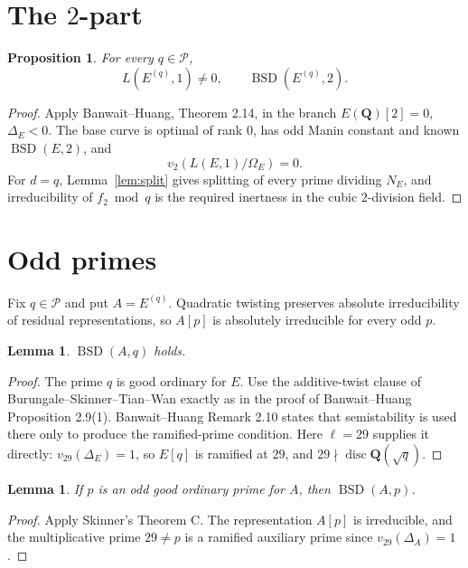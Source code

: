 \documentclass[11pt]{article}
\newtheorem{proposition}[theorem]{Proposition}
\newtheorem{lemma}[theorem]{Lemma}
\newcommand{\Q}{\mathbf Q}
\newcommand{\BSD}{\operatorname{BSD}}
\begin{document}
\section{The \(2\)-part}

\begin{proposition}\label{prop:2part}
For every \(q\in\mathcal P\),
\[
L(E^{(q)},1)\ne0,\qquad \BSD(E^{(q)},2).
\]
\end{proposition}

\begin{proof}
Apply Banwait--Huang, Theorem 2.14, in the branch
\(E(\Q)[2]=0\), \(\Delta_E<0\).  The base curve is optimal of rank \(0\),
has odd Manin constant and known \(\BSD(E,2)\), and
\[
v_2(L(E,1)/\Omega_E)=0.
\]
For \(d=q\), Lemma~\ref{lem:split} gives splitting of every prime dividing
\(N_E\), and irreducibility of \(f_2\bmod q\) is the required inertness in
the cubic \(2\)-division field.
\end{proof}

\section{Odd primes}

Fix \(q\in\mathcal P\) and put \(A=E^{(q)}\).
Quadratic twisting preserves absolute irreducibility of residual
representations, so \(A[p]\) is absolutely irreducible for every odd \(p\).

\begin{lemma}\label{lem:qpart}
\(\BSD(A,q)\) holds.
\end{lemma}

\begin{proof}
The prime \(q\) is good ordinary for \(E\).  Use the additive-twist clause
of Burungale--Skinner--Tian--Wan exactly as in the proof of
Banwait--Huang Proposition 2.9(1).  Banwait--Huang Remark 2.10 states that
semistability is used there only to produce the ramified-prime condition.
Here \(\ell=29\) supplies it directly:
\(v_{29}(\Delta_E)=1\), so \(E[q]\) is ramified at \(29\), and
\(29\nmid\operatorname{disc}\Q(\sqrt q)\).
\end{proof}

\begin{lemma}\label{lem:ordinaryp}
If \(p\) is an odd good ordinary prime for \(A\), then \(\BSD(A,p)\).
\end{lemma}

\begin{proof}
Apply Skinner's Theorem C.  The representation \(A[p]\) is irreducible, and
the multiplicative prime \(29\ne p\) is a ramified auxiliary prime since
\(v_{29}(\Delta_A)=1\).
\end{proof}
\end{document}
